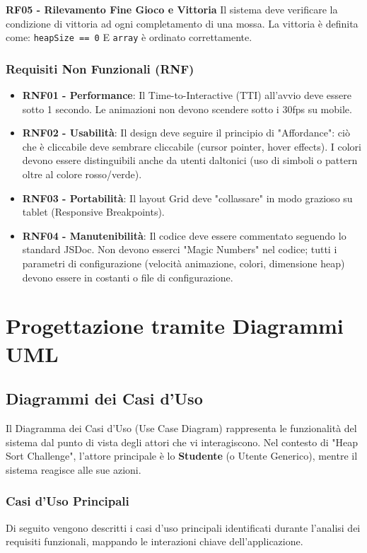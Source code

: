 \documentclass[openany]{theme/uniprthesis}
\begin{document}
\noindent
\textbf{RF05 - Rilevamento Fine Gioco e Vittoria}
Il sistema deve verificare la condizione di vittoria ad ogni completamento di una mossa. La vittoria è definita come: \texttt{heapSize == 0} E \texttt{array} è ordinato correttamente.

\subsection{Requisiti Non Funzionali (RNF)}
\begin{itemize}
    \item \textbf{RNF01 - Performance}: Il Time-to-Interactive (TTI) all'avvio deve essere sotto 1 secondo. Le animazioni non devono scendere sotto i 30fps su mobile.
    \item \textbf{RNF02 - Usabilità}: Il design deve seguire il principio di "Affordance": ciò che è cliccabile deve sembrare cliccabile (cursor pointer, hover effects). I colori devono essere distinguibili anche da utenti daltonici (uso di simboli o pattern oltre al colore rosso/verde).
    \item \textbf{RNF03 - Portabilità}: Il layout Grid deve "collassare" in modo grazioso su tablet (Responsive Breakpoints).
    \item \textbf{RNF04 - Manutenibilità}: Il codice deve essere commentato seguendo lo standard JSDoc. Non devono esserci "Magic Numbers" nel codice; tutti i parametri di configurazione (velocità animazione, colori, dimensione heap) devono essere in costanti o file di configurazione.
\end{itemize}

\chapter{Progettazione tramite Diagrammi UML}

\section{Diagrammi dei Casi d'Uso}
Il Diagramma dei Casi d'Uso (Use Case Diagram) rappresenta le funzionalità del sistema dal punto di vista degli attori che vi interagiscono. Nel contesto di "Heap Sort Challenge", l'attore principale è lo \textbf{Studente} (o Utente Generico), mentre il sistema reagisce alle sue azioni.

\subsection{Casi d'Uso Principali}
Di seguito vengono descritti i casi d'uso principali identificati durante l'analisi dei requisiti funzionali, mappando le interazioni chiave dell'applicazione.
\end{document}
